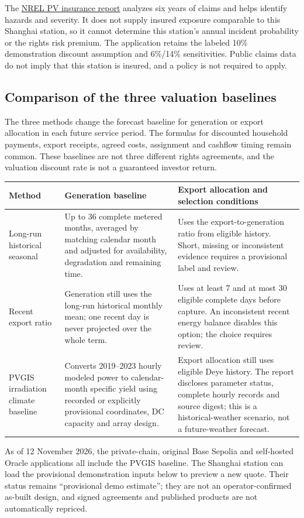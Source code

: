 \documentclass[12pt,a4paper]{article}
\begin{document}
The \href{https://www.nrel.gov/docs/fy21osti/78588.pdf}{NREL PV insurance report} analyzes six years of claims and helps identify hazards and severity. It does not supply insured exposure comparable to this Shanghai station, so it cannot determine this station's annual incident probability or the rights risk premium. The application retains the labeled 10\% demonstration discount assumption and 6\%/14\% sensitivities. Public claims data do not imply that this station is insured, and a policy is not required to apply.

\subsection{Comparison of the three valuation baselines}
The three methods change the forecast baseline for generation or export allocation in each future service period. The formulas for discounted household payments, export receipts, agreed costs, assignment and cashflow timing remain common. These baselines are not three different rights agreements, and the valuation discount rate is not a guaranteed investor return.

\begin{longtable}{L{3.1cm}L{5.4cm}L{6.2cm}}\toprule Method & Generation baseline & Export allocation and selection conditions\\\midrule
Long-run historical seasonal & Up to 36 complete metered months, averaged by matching calendar month and adjusted for availability, degradation and remaining time. & Uses the export-to-generation ratio from eligible history. Short, missing or inconsistent evidence requires a provisional label and review.\\\midrule
Recent export ratio & Generation still uses the long-run historical monthly mean; one recent day is never projected over the whole term. & Uses at least 7 and at most 30 eligible complete days before capture. An inconsistent recent energy balance disables this option; the choice requires review.\\\midrule
PVGIS irradiation climate baseline & Converts 2019–2023 hourly modeled power to calendar-month specific yield using recorded or explicitly provisional coordinates, DC capacity and array design. & Export allocation still uses eligible Deye history. The report discloses parameter status, complete hourly records and source digest; this is a historical-weather scenario, not a future-weather forecast.\\\bottomrule\end{longtable}
As of 12 November 2026, the private-chain, original Base Sepolia and self-hosted Oracle applications all include the PVGIS baseline. The Shanghai station can load the provisional demonstration inputs below to preview a new quote. Their status remains “provisional demo estimate”; they are not an operator-confirmed as-built design, and signed agreements and published products are not automatically repriced.
\end{document}
